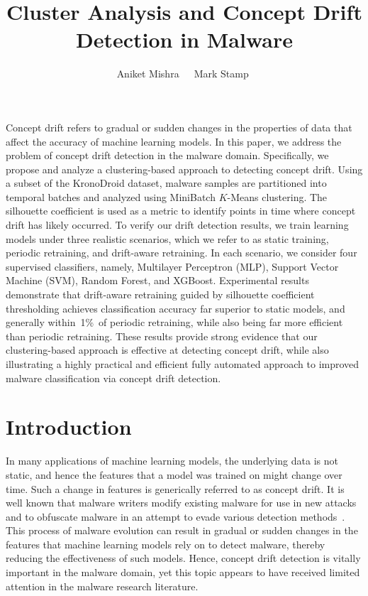 \documentclass[12pt]{article}
\title{Cluster Analysis and Concept Drift Detection in Malware}
\author{Aniket Mishra\footnotemark[1]\ \ \ 
Mark Stamp\footnotemark[1]\,\,\footnotemark[2]}
\begin{document}
\symbolfootnotetext[2]{mark.stamp$@$sjsu.edu}

\maketitle

\abstract
Concept drift refers to gradual or sudden 
changes in the properties of data that affect the accuracy of machine learning models. 
In this paper, we address the problem of concept drift detection in the malware domain.
Specifically, we propose and analyze a clustering-based approach to detecting
concept drift. Using a subset of the KronoDroid dataset, malware samples are partitioned 
into temporal batches and analyzed using MiniBatch $K$-Means clustering. 
The silhouette coefficient is used 
as a metric to identify points in time where concept drift has likely occurred. To verify our
drift detection results, we train learning models under three realistic scenarios, 
which we refer to as static training, periodic retraining, and drift-aware retraining. 
In each scenario, we consider four supervised classifiers, namely, Multilayer Perceptron (MLP), 
Support Vector Machine (SVM), Random Forest, and XGBoost. 
Experimental results demonstrate that drift-aware retraining guided by 
silhouette coefficient thresholding 
achieves classification accuracy far superior to static models, and generally
within~1\%\ of periodic retraining, 
while also being far more efficient than periodic retraining. 
These results provide strong evidence that our clustering-based 
approach is effective at detecting concept drift, while also illustrating a 
highly practical and efficient fully automated approach to improved malware 
classification via concept drift detection.

\section{Introduction}\label{chap:intro}

In many applications of machine learning models, the underlying data is not static, 
and hence the features that a model was trained on might change over time. 
Such a change in features is generically referred to  
as concept drift. It is well known that malware writers modify existing malware for use 
in new attacks and to obfuscate malware in an attempt to evade various detection methods~\cite{Lout2024,luomaaho2023analysis}. 
This process of malware evolution can result in gradual or sudden changes in the 
features that machine learning models rely on to detect malware, thereby reducing 
the effectiveness of such models. Hence, concept drift detection is vitally important
in the malware domain, yet this topic appears to have received limited attention 
in the malware research literature. 
\end{document}

